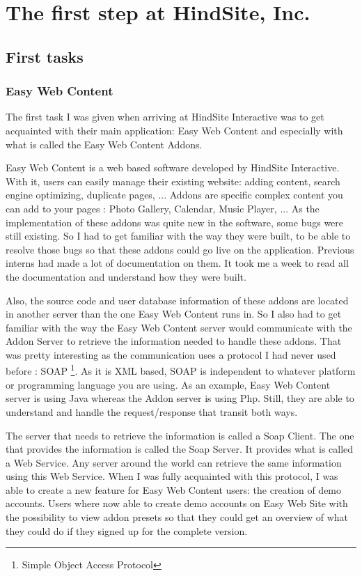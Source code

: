 \chapter{The first step at HindSite, Inc. }

\section{First tasks}

\subsection{Easy Web Content}

The first task I was given when arriving at HindSite Interactive was to get acquainted with their main application: Easy Web Content and especially with what is called the Easy Web Content Addons.

Easy Web Content is a web based software developed by HindSite Interactive. With it, users can easily manage their existing website: adding content, search engine optimizing, duplicate pages, ... Addons are specific complex content you can add to your pages : Photo Gallery, Calendar, Music Player, ... As the implementation of these addons was quite new in the software, some bugs were still existing. So I had to get familiar with the way they were built, to be able to resolve those bugs so that these addons could go live on the application. Previous interns had made a lot of documentation on them. It took me a week to read all the documentation and understand how they were built.

Also, the source code and user database information of these addons are located in another server than the one Easy Web Content runs in. So I also had to get familiar with the way the Easy Web Content server would communicate with the Addon Server to retrieve the information needed to handle these addons. That was pretty interesting as the communication uses a protocol I had never used before : SOAP \footnote{Simple Object Access Protocol}. %
As it is XML based, SOAP is independent to whatever platform or programming language you are using. As an example, Easy Web Content server is using Java whereas the Addon server is using Php. Still, they are able to understand and handle the request/response that transit both ways.

The server that needs to retrieve the information is called a Soap Client. The one that provides the information is called the Soap Server. It provides what is called a Web Service. Any server around the world can retrieve the same information using this Web Service.
When I was fully acquainted with this protocol, I was able to create a new feature for Easy Web Content users: the creation of demo accounts. Users where now able to create demo accounts on Easy Web Site with the possibility to view addon presets so that they could get an overview of what they could do if they signed up for the complete version.


